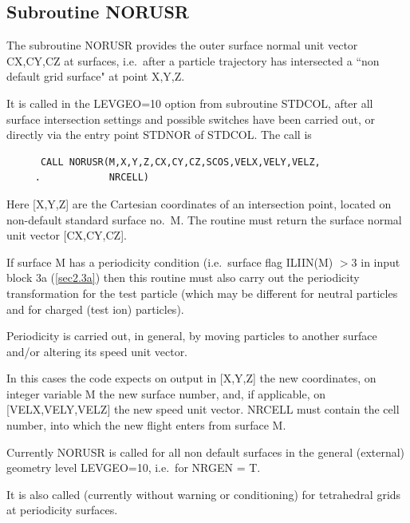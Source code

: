 \subsection{Subroutine NORUSR}
\label{sec3.8.4}

The subroutine NORUSR provides the outer surface normal unit vector CX,CY,CZ at
surfaces, i.e.\ after a particle trajectory has intersected a ``non default
grid surface" at point X,Y,Z.

It is called in the LEVGEO=10 option from subroutine STDCOL,  after all surface
intersection settings and possible switches have been carried out, or directly
via the entry point STDNOR of STDCOL.
The call is 

\begin{lstlisting}
      CALL NORUSR(M,X,Y,Z,CX,CY,CZ,SCOS,VELX,VELY,VELZ,
     .            NRCELL)
\end{lstlisting} 

Here [X,Y,Z] are the Cartesian coordinates of an intersection point, located on
non-default standard surface no.\ M.
The routine must return the surface normal unit vector [CX,CY,CZ].

If surface M has a periodicity condition (i.e.\ surface flag ILIIN(M) $>$3 in
input block 3a (\cref{sec2.3a}) then this routine must also carry out the
periodicity transformation for the test particle (which may be different for
neutral particles and for charged (test ion) particles).

Periodicity is carried out, in general, by moving particles to another surface
and/or altering its speed unit vector.

In this cases the code expects on output in [X,Y,Z] the new coordinates, on
integer variable M the new surface number, and, if applicable, on
  [VELX,VELY,VELZ] the new speed unit vector.
NRCELL must contain the cell number, into which the new flight enters from
surface M.

Currently NORUSR is called for all non default surfaces in the general
(external) geometry level LEVGEO=10, i.e.\ for NRGEN = T.

It is also called (currently without warning or conditioning) for tetrahedral
grids at periodicity surfaces.
